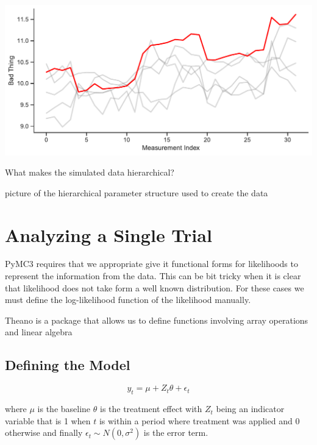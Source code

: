 \documentclass[12pt,a4paper,leqno]{report}
\theoremstyle{plain}
\theoremstyle{definition}
\theoremstyle{remark}
\begin{document}
\bigskip
{
    \centering
    \includegraphics[width=\textwidth,height=\textheight,keepaspectratio]{measurements_timeline.pdf}
    \par
}
\bigskip



What makes the simulated data hierarchical?

picture of the hierarchical parameter structure used to create the data

\section{Analyzing a Single Trial}\label{1trial}

PyMC3 requires that we appropriate give it functional forms for likelihoods to
represent the information from the data. This can be bit tricky when it is clear
that likelihood does not take form a well known distribution. For these cases we
must define the log-likelihood function of the likelihood manually.

Theano is a package that allows us to define functions involving array
operations and linear algebra

\subsection{Defining the Model}\label{1model}

\begin{def}\label{simulationmodel}
    \begin{equation}\label{}
        y_t = \mu + Z_t\theta + \epsilon_t
    \end{equation}
\end{def}where \(\mu\) is the baseline \(\theta\) is the treatment effect with
\(Z_t\) being an indicator variable that is 1 when \(t\) is within a period
where treatment was applied and 0 otherwise and finally \(\epsilon_t \sim
N(0,\sigma^2) \) is the error term.
\end{document}
